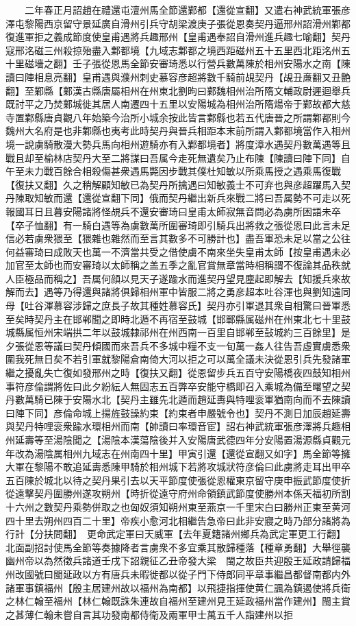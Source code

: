 　　二年春正月詔趙在禮還屯澶州馬全節還鄴都【還從宣翻】又遣右神武統軍張彦澤屯黎陽西京留守景延廣自滑州引兵守胡梁渡庚子張從恩奏契丹逼邢州詔滑州鄴都復進軍拒之義成節度使皇甫遇將兵趣邢州【皇甫遇奉詔自滑州進兵趣七喻翻】契丹寇邢洺磁三州殺掠殆盡入鄴都境【九域志鄴都之境西距磁州五十五里西北距洺州五十里磁墻之翻】壬子張從恩馬全節安審琦悉以行營兵數萬陳於相州安陽水之南【陳讀曰陣相息亮翻】皇甫遇與濮州刺史慕容彦超將數千騎前覘契丹【覘丑亷翻又丑艶翻】至鄴縣【鄴漢古縣唐屬相州在州東北劉昫曰鄴魏相州治所隋文輔政尉遲迴舉兵既討平之乃焚鄴城徙其居人南遷四十五里以安陽城為相州治所隋煬帝于鄴故都大慈寺置鄴縣唐貞觀八年始築今治所小城余按此皆言鄴縣也若五代唐晉之所謂鄴都則今魏州大名府是也非鄴縣也夷考此時契丹與晉兵相距本末前所謂入鄴都境當作入相州境一說虜騎散漫大勢兵馬向相州遊騎亦有入鄴都境者】將度漳水遇契丹數萬遇等且戰且却至榆林店契丹大至二將謀曰吾属今走死無遺矣乃止布陳【陳讀曰陣下同】自午至未力戰百餘合相殺傷甚衆遇馬斃因步戰其僕杜知敏以所乘馬授之遇乘馬復戰【復扶又翻】久之稍解顧知敏已為契丹所擒遇曰知敏義士不可弃也與彦超躍馬入契丹陳取知敏而還【還從宣翻下同】俄而契丹繼出新兵來戰二將曰吾属勢不可走以死報國耳日且暮安陽諸將怪覘兵不還安審琦曰皇甫太師寂無音問必為虜所困語未卒【卒子恤翻】有一騎白遇等為虜數萬所圍審琦即引騎兵出將救之張從恩曰此言未足信必若虜衆猥至【猥雜也雜然而至言其數多不可勝計也】盡吾軍恐未足以當之公往何益審琦曰成敗天也萬一不濟當共受之借使虜不南來坐失皇甫太師【按皇甫遇未必加官至太師也而安審琦以太師稱之盖五季之亂官賞無章當時相稱謂不復論其品秩就人臣極品而稱之】吾属何顔以見天子遂踰水而進契丹望見塵起即解去【知援兵來故解而去】遇等乃得還與諸將俱歸相州軍中皆服二將之勇彦超本吐谷渾也與劉知遠同母【吐谷渾慕容涉歸之庶長子故其種姓慕容氏】契丹亦引軍退其衆自相驚曰晉軍悉至矣時契丹主在邯郸聞之即時北遁不再宿至鼓城【邯鄲縣属磁州在州東北七十里鼓城縣属恒州宋端拱二年以鼓城隸祁州在州西南一百里自邯郸至鼔城約三百餘里】是夕張從恩等議曰契丹傾國而來吾兵不多城中糧不支一旬萬一姦人往告吾虛實虜悉衆圍我死無日矣不若引軍就黎陽倉南倚大河以拒之可以萬全議未決從恩引兵先發諸軍繼之擾亂失亡復如發邢州之時【復扶又翻】從恩留步兵五百守安陽橋夜四鼓知相州事符彦倫謂將佐曰此夕紛紜人無固志五百弊卒安能守橋即召入乘城為備至曙望之契丹數萬騎已陳于安陽水北【契丹主雖先北遁而趙延夀與特哩衮軍猶南向而不去陳讀曰陣下同】彦倫命城上揚旌鼓譟約束【約束者申嚴號令也】契丹不測日加辰趙延壽與契丹特哩衮衆踰水環相州而南【帥讀曰率環音宦】詔右神武統軍張彦澤將兵趣相州延壽等至湯陰聞之【湯陰本漢蕩陰後并入安陽唐武德四年分安陽置湯源縣貞觀元年改為湯陰属相州九域志在州南四十里】甲寅引還【還從宣翻又如字】馬全節等擁大軍在黎陽不敢追延夀悉陳甲騎於相州城下若將攻城狀符彦倫曰此虜將走耳出甲卒五百陳於城北以待之契丹果引去以天平節度使張從恩權東京留守庚申振武節度使折從遠擊契丹圍勝州遂攻朔州【時折從遠守府州命領鎮武節度使勝州本係天福初所割十六州之數契丹乘勢併取之也匈奴須知朔州東至燕京一千里宋白曰勝州正東至黄河四十里去朔州四百二十里】帝疾小愈河北相繼告急帝曰此非安寢之時乃部分諸將為行計【分扶問翻】　更命武定軍曰天威軍【去年夏籍諸州鄉兵為武定軍更工行翻】　北面副招討使馬全節等奏據降者言虜衆不多宜乘其散歸種落【種章勇翻】大舉徑襲幽州帝以為然徵兵諸道壬戌下詔親征乙丑帝發大梁　閩之故臣共迎殷王延政請歸福州改國號曰閩延政以方有唐兵未暇徙都以從子門下侍郎同平章事繼昌都督南都内外諸軍事鎮福州【殷主居建州故以福州為南都】以飛捷指揮使黄仁諷為鎮遏使將兵衛之林仁翰至福州【林仁翰既誅朱連故自福州至建州見王延政福州當作建州】閩主賞之甚薄仁翰未嘗自言其功發南都侍衛及兩軍甲士萬五千人詣建州以拒
